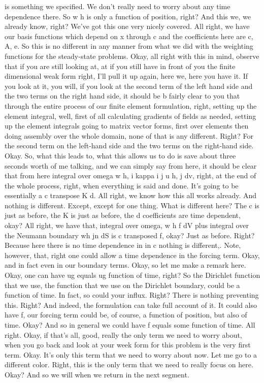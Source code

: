 \documentclass[10pt]{article}
\begin{document}
is something we specified. We don't really need to worry about any time dependence there. So w h is only a function of position, right? And this we, we already know, right? We've got this one very nicely covered. All right, we have our basis functions which depend on x through c and the coefficients here are c, A, e. So this is no different in any manner from what we did with the weighting functions for the steady-state problems. Okay, all right with this in mind, observe that if you are still looking at, at if you still have in front of you the finite dimensional weak form right, I'll pull it up again, here we, here you have it. If you look at it, you will, if you look at the second term of the left hand side and the two terms on the right hand side, it should be b fairly clear to you that through the entire process of our finite element formulation, right, setting up the element integral, well, first of all calculating gradients of fields as needed, setting up the element integrals going to matrix vector forms, first over elements then doing assembly over the whole domain, none of that is any different. Right? For the second term on the left-hand side and the two terms on the right-hand side. Okay. So, what this leads to, what this allows us to do is save about three seconds worth of me talking, and we can simply say from here, it should be clear that from here integral over omega w h, i kappa i j u h, j dv, right, at the end of the whole process, right, when everything is said and done. It's going to be essentially a c transpose K d. All right, we know how this all works already. And nothing is different. Except, except for one thing. What is different here? The c is just as before, the K is just as before, the d coefficients are time dependent, okay? All right, we have that, integral over omega, w h f dV plus integral over the Neumann boundary wh jn dS is c transposed f, okay? Just as before. Right? Because here there is no time dependence in in c nothing is different,. Note, however, that, right one could allow a time dependence in the forcing term. Okay, and in fact even in our boundary terms. Okay, so let me make a remark here. Okay, one can have ug equals ug function of time, right? So the Dirichlet function that we use, the function that we use on the Dirichlet boundary, could be a function of time. In fact, so could your influx. Right? There is nothing preventing this. Right? And indeed, the formulation can take full account of it. It could also have f, our forcing term could be, of course, a function of position, but also of time. Okay? And so in general we could have f equals some function of time. All right. Okay, if that's all, good, really the only term we need to worry about, when you go back and look at your week form for this problem is the very first term. Okay. It's only this term that we need to worry about now. Let me go to a different color. Right, this is the only term that we need to really focus on here. Okay? And so we will when we return in the next segment.
\end{document}

